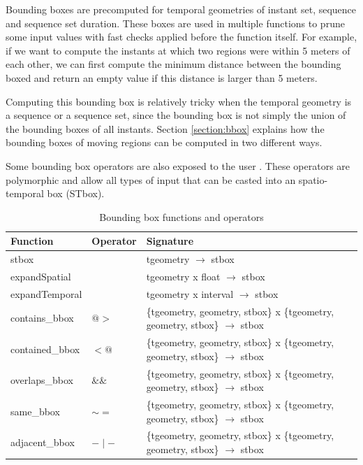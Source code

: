 Bounding boxes are precomputed for temporal geometries of instant set, sequence and sequence set duration. These boxes are used in multiple functions to prune some input values with fast checks applied before the function itself. For example, if we want to compute the instants at which two regions were within 5 meters of each other, we can first compute the minimum distance between the bounding boxed and return an empty value if this distance is larger than 5 meters.

Computing this bounding box is relatively tricky when the temporal geometry is a sequence or a sequence set, since the bounding box is not simply the union of the bounding boxes of all instants. Section \ref{section:bbox} explains how the bounding boxes of moving regions can be computed in two different ways.

Some bounding box operators are also exposed to the user . These operators are polymorphic and allow all types of input that can be casted into an spatio-temporal box (STbox). 

\begin{table}[h!]
    \centering
    \begin{tabularx}{\textwidth}{|l|l|X|}
    \hline
    \textbf{Function}   & \textbf{Operator} & \textbf{Signature} \\ 
    \hline
    stbox               & & tgeometry $\rightarrow$ stbox\\
    \hline
    expandSpatial       & & tgeometry x float $\rightarrow$ stbox\\
    \hline
    expandTemporal      & & tgeometry x interval $\rightarrow$ stbox \\
    \hline
    contains\_bbox      & $@>$ & \{tgeometry, geometry, stbox\} x \{tgeometry, geometry, stbox\} $\rightarrow$ stbox \\
    \hline
    contained\_bbox     & $<@$ & \{tgeometry, geometry, stbox\} x \{tgeometry, geometry, stbox\} $\rightarrow$ stbox \\
    \hline
    overlaps\_bbox      & $\&\&$ & \{tgeometry, geometry, stbox\} x \{tgeometry, geometry, stbox\} $\rightarrow$ stbox \\
    \hline
    same\_bbox          & $\sim=$ & \{tgeometry, geometry, stbox\} x \{tgeometry, geometry, stbox\} $\rightarrow$ stbox \\
    \hline
    adjacent\_bbox      & $-\mid-$ & \{tgeometry, geometry, stbox\} x \{tgeometry, geometry, stbox\} $\rightarrow$ stbox \\
    \hline
    \end{tabularx}
    \caption{Bounding box functions and operators}
    \label{table:bbox_funcs}
\end{table}
